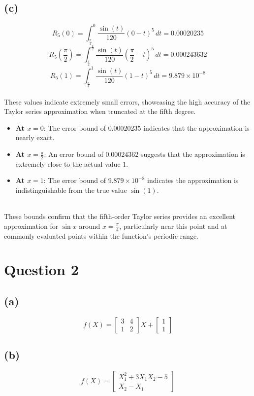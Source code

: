 \documentclass{article}
\begin{document}
\subsection*{(c)}
\[ R_5(0) = \int_{\frac{\pi}{4}}^{0} \frac{\sin(t)}{120} (0 - t)^5 \, dt = 0.00020235 \]
\[ R_5(\frac{\pi}{2}) = \int_{\frac{\pi}{4}}^{\frac{\pi}{2}} \frac{\sin(t)}{120} (\frac{\pi}{2} - t)^5 \, dt = 0.000243632 \]
\[ R_5(1) = \int_{\frac{\pi}{4}}^{1} \frac{\sin(t)}{120} (1 - t)^5 \, dt = 9.879 \times 10^{-8} \]
\\
These values indicate extremely small errors, showcasing the high accuracy of the Taylor series approximation when truncated at the fifth degree.

\begin{itemize}
    \item \textbf{At \(x = 0\)}: The error bound of \(0.00020235\) indicates that the approximation is nearly exact.
    \item \textbf{At \(x = \frac{\pi}{2}\)}: An error bound of \(0.00024362\) suggests that the approximation is extremely close to the actual value \(1\).
    \item \textbf{At \(x = 1\)}: The error bound of \(9.879 \times 10^{-8}\) indicates the approximation is indistinguishable from the true value \(\sin(1)\).
\end{itemize}
\\
These bounds confirm that the fifth-order Taylor series provides an excellent approximation for \(\sin x\) around \(x = \frac{\pi}{4}\), particularly near this point and at commonly evaluated points within the function's periodic range. 

\section*{Question 2}

\subsection*{(a)}
\[ f(X) = \begin{bmatrix} 3 & 4 \\ 1 & 2 \end{bmatrix} X + \begin{bmatrix} 1 \\ 1 \end{bmatrix} \]

\subsection*{(b)}
\[ f(X) = \begin{bmatrix} X_1^2 + 3X_1X_2 - 5 \\ X_2 - X_1 \end{bmatrix} \]
\end{document}
